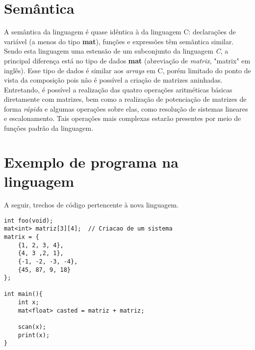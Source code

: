 \documentclass[
	article,			%
	11pt,				%
	oneside,			%
	a4paper,			%
	english,			%
	brazil,				%
	sumario=tradicional
	]{abntex2}
\renewcommand{\it}[1]{\textit{#1}}
\renewcommand{\bf}[1]{\textbf{#1}}
\begin{document}
\section{Semântica}
A semântica da linguagem é quase idêntica à da linguagem C: declarações de variável (a menos do tipo \bf{mat}), funções e expressões têm semãntica similar. Sendo esta linguagem uma estensão de um subconjunto da linguagem \it{C}, a principal diferença está no tipo de dados \bf{mat} (abreviação de \it{matrix}, "matrix" em inglês). Esse tipo de dados é similar aos \it{arrays} em C, porém limitado do ponto de vista da composição pois não é possível a criação de matrizes aninhadas. Entretando, é possível a realização das quatro operações aritméticas básicas diretamente com matrizes, bem como a realização de potenciação de matrizes de forma \it{rápida} e algumas operações sobre elas, como resolução de sistemas lineares e escalonamento. Tais operações mais complexas estarão presentes por meio de funções padrão da linguagem.

\section{Exemplo de programa na linguagem}
A seguir, trechos de código pertencente à nova linguagem.

\begin{lstlisting}[style=CStyle]
int foo(void);
mat<int> matriz[3][4];	// Criacao de um sistema 
matrix = {
	{1, 2, 3, 4},
	{4, 3 ,2, 1},
	{-1, -2, -3, -4},
	{45, 87, 9, 18}
};

int main(){
	int x;
	mat<float> casted = matriz + matriz;
	
	scan(x);
	print(x); 
}
\end{lstlisting}


% 

\end{document}
